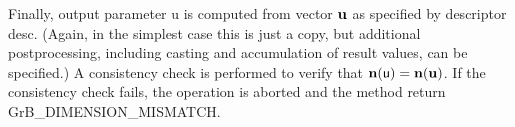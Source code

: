 Finally, output parameter {\sf u} is computed from vector ${\bf u}$
as specified by descriptor {\sf desc}. (Again, in the simplest case this
is just a copy, but additional postprocessing, including casting and
accumulation of result values, can be specified.)  A consistency check is
performed to verify that $\bold{n}({\sf u}) = \bold{n}({\bf u})$. If
the consistency check fails, the operation is aborted and the method
return {\sf GrB\_DIMENSION\_MISMATCH}.
